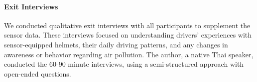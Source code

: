
\paragraph{Exit Interviews}
We conducted qualitative exit interviews with all participants to supplement the sensor data. 
These interviews focused on understanding drivers' experiences with sensor-equipped helmets, their daily driving patterns, and any changes in awareness or behavior regarding air pollution. 
The author, a native Thai speaker, conducted the 60-90 minute interviews, using a semi-structured approach with open-ended questions. 